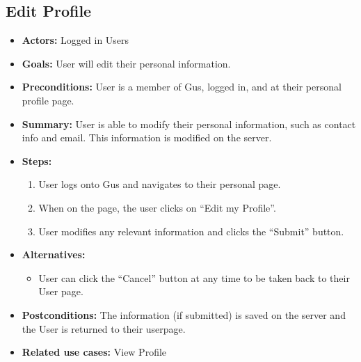 \subsection{Edit Profile}
  \begin{itemize}
          \item{\textbf{Actors:} Logged in Users }
          \item{\textbf{Goals:} User will edit their personal information. }
          \item{\textbf{Preconditions:} User is a member of Gus, logged in, and at their personal profile page.}
          \item{\textbf{Summary:} User is able to modify their personal information, such as contact info and email. This information is modified on the server. }
	  \item{\textbf{Steps:}}
	  \begin{enumerate}
	       \item{User logs onto Gus and navigates to their personal page.}
	       \item{When on the page, the user clicks on ``Edit my Profile''.}
	       \item{User modifies any relevant information and clicks the ``Submit'' button.}
	  \end{enumerate}
	  \item{\textbf{Alternatives:}}
	  \begin{itemize}
	       \item{User can click the ``Cancel'' button at any time to be taken back to their User page.}
	  \end{itemize}
	  \item{\textbf{Postconditions:} The information (if submitted) is saved on the server and the User is returned to their userpage.}
	  \item{\textbf{Related use cases:} View Profile }
     \end{itemize}
